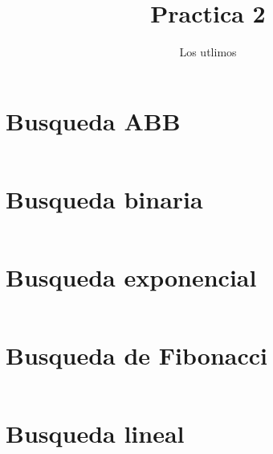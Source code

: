 \documentclass[12pt]{report}
\title{Practica 2}
\author{Los utlimos}
\begin{document}
\section*{Busqueda ABB}
\inputminted{C}{babinario.c}
\newpage
\section*{Busqueda binaria}
\inputminted{C}{bbinaria.c}
\newpage
\section*{Busqueda exponencial}
\inputminted{C}{bexponencial.c}
\newpage
\section*{Busqueda de Fibonacci}
\inputminted{C}{bfibonacci.c}
\newpage
\section*{Busqueda lineal}
\inputminted{C}{blineal.c}
\end{document}
